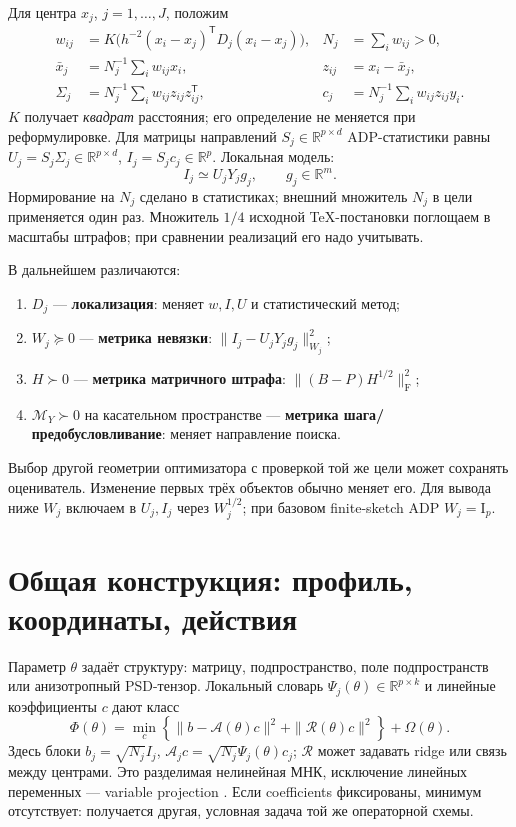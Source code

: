 \documentclass[11pt,a4paper]{article}
\newcommand{\R}{\mathbb R}
\newcommand{\Id}{\mathrm I}
\newcommand{\T}{^{\mathsf T}}
\newcommand{\F}{_{\mathrm F}}
\begin{document}
Для центра $x_j$, $j=1,\ldots,J$, положим
\begin{align}
 w_{ij}&=K\bigl(h^{-2}(x_i-x_j)\T D_j(x_i-x_j)\bigr),&
 N_j&=\sum_i w_{ij}>0,\label{eq:weights}\\
 \bar x_j&=N_j^{-1}\sum_i w_{ij}x_i,&
 z_{ij}&=x_i-\bar x_j,\nonumber\\
 \Sigma_j&=N_j^{-1}\sum_i w_{ij}z_{ij}z_{ij}\T,&
 c_j&=N_j^{-1}\sum_i w_{ij}z_{ij}y_i.\label{eq:moments}
\end{align}
$K$ получает \emph{квадрат} расстояния; его определение не меняется при
реформулировке. Для матрицы направлений $S_j\in\R^{p\times d}$
ADP-статистики равны $U_j=S_j\Sigma_j\in\R^{p\times d}$,
$I_j=S_jc_j\in\R^p$. Локальная модель:
\begin{equation}\label{eq:local}
 I_j\simeq U_jY_jg_j,\qquad g_j\in\R^m.
\end{equation}
Нормирование на $N_j$ сделано в статистиках; внешний множитель $N_j$
в цели применяется один раз. Множитель $1/4$ исходной TeX-постановки
поглощаем в масштабы штрафов; при сравнении реализаций его надо учитывать.

В дальнейшем различаются:
\begin{enumerate}
\item $D_j$ --- \textbf{локализация}: меняет $w,I,U$ и статистический метод;
\item $W_j\succeq0$ --- \textbf{метрика невязки}:
      $\|I_j-U_jY_jg_j\|_{W_j}^2$;
\item $H\succ0$ --- \textbf{метрика матричного штрафа}:
      $\|(B-P)H^{1/2}\|\F^2$;
\item $\mathcal M_Y\succ0$ на касательном пространстве ---
      \textbf{метрика шага/предобусловливание}: меняет направление поиска.
\end{enumerate}
Выбор другой геометрии оптимизатора с проверкой той же цели может сохранять
оцениватель. Изменение первых трёх объектов обычно меняет его.
Для вывода ниже $W_j$ включаем в $U_j,I_j$ через $W_j^{1/2}$;
при базовом finite-sketch ADP $W_j=\Id_p$.

\section{Общая конструкция: профиль, координаты, действия}\label{sec:framework}

Параметр $\theta$ задаёт структуру: матрицу, подпространство, поле
подпространств или анизотропный PSD-тензор. Локальный словарь
$\Psi_j(\theta)\in\R^{p\times k}$ и линейные коэффициенты $c$ дают класс
\begin{equation}\label{eq:master}
 \Phi(\theta)=\min_c\left\{
       \|b-\mathcal A(\theta)c\|^2+\|\mathcal R(\theta)c\|^2
                         \right\}+\Omega(\theta).
\end{equation}
Здесь блоки $b_j=\sqrt{N_j}I_j$,
$\mathcal A_jc=\sqrt{N_j}\Psi_j(\theta)c_j$; $\mathcal R$ может задавать
ridge или связь между центрами. Это разделимая нелинейная МНК,
исключение линейных переменных --- variable projection \cite{varpro}.
Если coefficients фиксированы, минимум отсутствует: получается другая,
условная задача той же операторной схемы.
\end{document}
